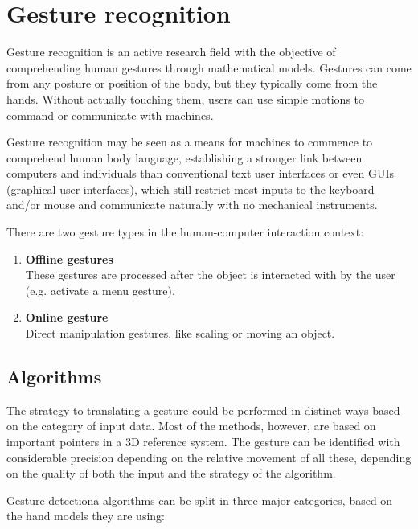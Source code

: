 \documentclass[12pt,a4paper,twoside]{report}
\begin{document}
\section{Gesture recognition}
Gesture recognition is an active research field with the objective of comprehending human gestures through mathematical models. Gestures can come from any posture or position of the body, but they typically come from the hands. Without actually touching them, users can use simple motions to command or communicate with machines.

Gesture recognition may be seen as a means for machines to commence to comprehend human body language, establishing a stronger link between computers and individuals than conventional text user interfaces or even GUIs (graphical user interfaces), which still restrict  most inputs to the keyboard and/or mouse and communicate naturally with no mechanical instruments.

There are two gesture types in the human-computer interaction context:

\begin{enumerate}
  \item \textbf{Offline gestures} \\
    These gestures are processed after the object is interacted with by the user (e.g. activate a menu gesture).

  \item \textbf{Online gesture} \\
    Direct manipulation gestures, like scaling or moving an object.
\end{enumerate}

\subsection{Algorithms}
The strategy to translating a gesture could be performed in distinct ways based on the category of input data. Most of the methods, however, are based on important pointers in a 3D reference system. The gesture can be identified with considerable precision depending on the relative movement of all these, depending on the quality of both the input and the strategy of the algorithm.

Gesture detectiona algorithms can be split in three major categories, based on the hand models they are using:
\end{document}

